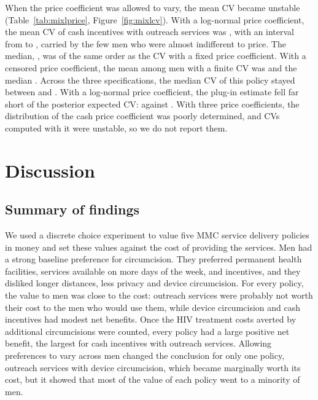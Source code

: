 \documentclass[11pt]{article}
\numberwithin{equation}{section}\numberwithin{figure}{section}\numberwithin{table}{section}
\begin{document}
When the price coefficient was allowed to vary, the mean CV became unstable (Table~\ref{tab:mixlprice}, Figure~\ref{fig:mixlcv}). With a log-normal price coefficient, the mean CV of cash incentives with outreach services was \mmcMXPFiveCVLogn, with an interval from \mmcMXPFiveCVloLogn{} to \mmcMXPFiveCVhiLogn, carried by the few men who were almost indifferent to price. The median, \mmcMXPFiveCVmedLogn, was of the same order as the CV with a fixed price coefficient. With a censored price coefficient, the mean among men with a finite CV was \mmcMXPFiveCVCens{} and the median \mmcMXPFiveCVmedCens. Across the three specifications, the median CV of this policy stayed between \mmcMXmedFiveMin{} and \mmcMXmedFiveMax. With a log-normal price coefficient, the plug-in estimate fell far short of the posterior expected CV: \mmcMXPFivePlugLogn{} against \mmcMXPFiveCVLogn. With three price coefficients, the distribution of the cash price coefficient was poorly determined, and CVs computed with it were unstable, so we do not report them.

\begin{table}[!htbp]
\centering
\caption{Compensating variation per uncircumcised man (2017 US\$) with the conditional logit and with the mixed logit under three distributions of the price coefficient (one price coefficient). Plug-in: the CV at each man's posterior mean coefficients. With a censored price coefficient, the men whose price coefficient is zero (\mmcMXcensZero) are left out.}\label{tab:mixlprice}
\small
{}
\end{table}


\section{Discussion}
\subsection{Summary of findings}
We used a discrete choice experiment to value five MMC service delivery policies in money and set these values against the cost of providing the services. Men had a strong baseline preference for circumcision. They preferred permanent health facilities, services available on more days of the week, and incentives, and they disliked longer distances, less privacy and device circumcision. For every policy, the value to men was close to the cost: outreach services were probably not worth their cost to the men who would use them, while device circumcision and cash incentives had modest net benefits. Once the HIV treatment costs averted by additional circumcisions were counted, every policy had a large positive net benefit, the largest for cash incentives with outreach services. Allowing preferences to vary across men changed the conclusion for only one policy, outreach services with device circumcision, which became marginally worth its cost, but it showed that most of the value of each policy went to a minority of men.
\end{document}
